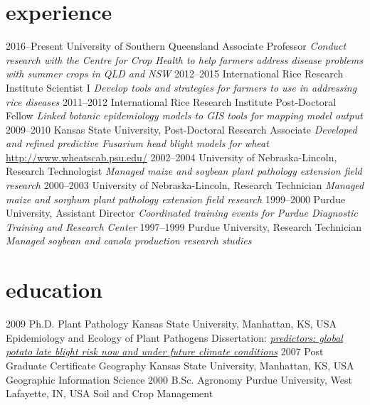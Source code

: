 \section*{experience}
\begin{entrylist}
  \entry
  {\small{2016--Present}}
    {University of Southern Queensland }
    {Associate Professor}
    {\emph{Conduct research with the Centre for Crop Health to help farmers address disease problems with summer crops in QLD and NSW}}
  \entry
    {\small{2012--2015}}
    {International Rice Research Institute }
    {Scientist I}
    {\emph{Develop tools and strategies for farmers to use in addressing rice diseases}}
  \entry
    {\small{2011--2012}}
    {International Rice Research Institute }
    {Post-Doctoral Fellow}
    {\emph{Linked botanic epidemiology models to GIS tools for mapping model output}}
  \entry
    {\small{2009--2010}}
    {Kansas State University, }
    {Post-Doctoral Research Associate}
    {\emph{Developed and refined predictive Fusarium head blight models for wheat}\\
    \href{http://www.wheatscab.psu.edu/}{http://www.wheatscab.psu.edu/}}
  \entry
   {\small{2002--2004}}
   {University of Nebraska-Lincoln, }
   {Research Technologist}
   {\emph{Managed maize and soybean plant pathology extension field research}}
  \entry
   {\small{2000--2003}}
   {University of Nebraska-Lincoln, }
   {Research Technician}
   {\emph{Managed maize and sorghum plant pathology extension field research}}
  \entry
   {\small{1999--2000}}
   {Purdue University, }
   {Assistant Director}
   {\emph{Coordinated training events for Purdue Diagnostic Training and Research Center}}
  \entry
   {\small{1997--1999}}
   {Purdue University, }
   {Research Technician}
   {\emph{Managed soybean and canola production research studies}}
\end{entrylist}

\section*{education}

\begin{entrylist}
  \entry
    {\small{2009}}
    {Ph.D. {\normalfont Plant Pathology}}
    {Kansas State University, Manhattan, KS, USA}
    {Epidemiology and Ecology of Plant Pathogens}
  \entry
    {}
    {Dissertation: }
    {}
      {\emph{\href{https://krex.k-state.edu/dspace/handle/2097/2341?show=full}{predictors: global potato late blight risk now and under future climate conditions}}}
 \entry
    {\small{2007}}
    {Post Graduate Certificate {\normalfont Geography}}
    {Kansas State University, Manhattan, KS, USA}
    {Geographic Information Science}
  \entry
    {\small{2000}}
    {B.Sc. {\normalfont Agronomy}}
    {Purdue University, West Lafayette, IN, USA}
    {Soil and Crop Management}
\end{entrylist}
